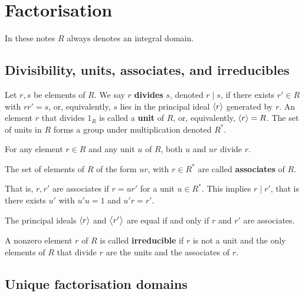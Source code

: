 \pagebreak

\section{Factorisation}

In these notes $ R $ always denotes an integral domain.

\subsection{Divisibility, units, associates, and irreducibles}

\begin{definition}
Let $ r, s $ be elements of $ R $. We say $ r $ \textbf{divides} $ s $, denoted $ r \mid s $, if there exists $ r' \in R $ with $ rr' = s $, or, equivalently, $ s $ lies in the principal ideal $ \left\langle r \right\rangle $ generated by $ r $. An element $ r $ that divides $ 1_R $ is called a \textbf{unit} of $ R $, or, equivalently, $ \left\langle r \right\rangle = R $. The set of units in $ R $ forms a group under multiplication denoted $ R^* $.
\end{definition}

For any element $ r \in R $ and any unit $ u $ of $ R $, both $ u $ and $ ur $ divide $ r $.

\begin{definition}
The set of elements of $ R $ of the form $ ur $, with $ r \in R^* $ are called \textbf{associates} of $ R $.
\end{definition}

That is, $ r, r' $ are associates if $ r = ur' $ for a unit $ u \in R^* $. This implies $ r \mid r' $, that is there exists $ u' $ with $ u'u = 1 $ and $ u'r = r' $.

\begin{note*}
The principal ideals $ \left\langle r \right\rangle $ and $ \left\langle r' \right\rangle $ are equal if and only if $ r $ and $ r' $ are associates.
\end{note*}

\begin{definition}
A nonzero element $ r $ of $ R $ is called \textbf{irreducible} if $ r $ is not a unit and the only elements of $ R $ that divide $ r $ are the units and the associates of $ r $.
\end{definition}

\subsection{Unique factorisation domains}

